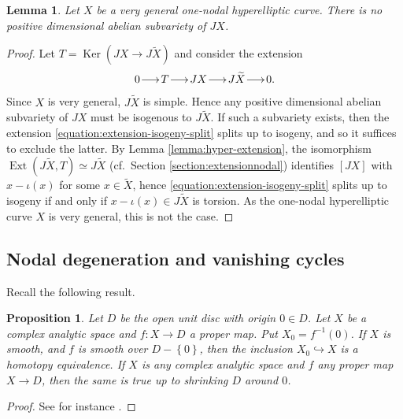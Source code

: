 \documentclass[a4paper,11pt,reqno]{amsart}
\makeatletter
\numberwithin{equation}{section}
\theoremstyle{plain}
\newtheorem{lemma}[theorem]{Lemma}
\newtheorem{proposition}[theorem]{Proposition}
\theoremstyle{definition}
\newcommand{\Ext}{\operatorname{Ext}}
\newcommand{\Ker}{\operatorname{Ker}}
\newcommand{\wt}[1]{{\widetilde{#1}}}
\renewcommand{\longrightarrow}{\xymatrix@1@=15pt{\ar[r]&}}
\renewcommand{\cong}{\simeq}
\newcommand{\set}[1]{\left\{ #1 \right\}}
\makeatother
\begin{document}
\begin{lemma} \label{lemma:compactabeliansubvarieties} 
Let $X$ be a very general one-nodal hyperelliptic curve. 
There is no positive dimensional abelian subvariety of $JX$. 
 \end{lemma}
 \begin{proof}
 Let $T = \Ker(JX \to J\wt X)$ and consider the extension
  \begin{align} \label{equation:extension-isogeny-split}
 0 \longrightarrow T \longrightarrow JX \longrightarrow J \wt X \longrightarrow 0 .
 \end{align}
 Since $X$ is very general, $J \wt X$ is simple.
 Hence any positive dimensional abelian subvariety of $JX$ must be isogenous to $J\wt X$.
 If such a subvariety exists, then the extension \eqref{equation:extension-isogeny-split}  splits up to isogeny, and so it suffices to exclude the latter.
By Lemma \ref{lemma:hyper-extension}, the isomorphism $\Ext(J \wt X, T) \cong J \wt X$ (cf.~Section \ref{section:extensionnodal}) identifies $[JX]$ with $x-\iota(x)$ for some $x \in \wt X$, hence \eqref{equation:extension-isogeny-split} splits up to isogeny if and only if $x-\iota(x) \in J \wt X$ is torsion. As the one-nodal hyperelliptic curve $X$ is very general, this is not the case.
 \end{proof}

\subsection{Nodal degeneration and vanishing cycles} \label{subsection:nodaldegenerationandcohomology}

Recall the following result. 

\begin{proposition} \label{proposition:fibrewise-retraction} 
    Let $D$ be the open unit disc with origin $0 \in D$. Let $X$ be a complex analytic space and $f \colon X \to D$ a proper map. Put $X_0 = f^{-1}(0)$. If $X$ is smooth, and $f$ is smooth over $D - \set{0}$, then the inclusion $X_0 \hookrightarrow X$ is a homotopy equivalence. If $X$ is any complex analytic space and $f$ any proper map $X \to D$, then the same is true up to shrinking $D$ around $0$. 
\end{proposition}
\begin{proof}
See for instance \cite[Proposition C.11 and Remark C.12.ii]{petersteenbrink}.
\end{proof}
\end{document}
